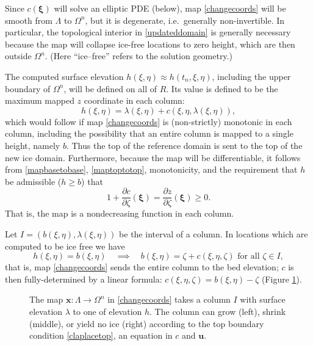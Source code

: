 \documentclass[letterpaper,final,12pt,reqno]{amsart}
\newcommand{\bu}{\mathbf{u}}
\newcommand{\bx}{\mathbf{x}}
\newcommand{\bxi}{\bm{\xi}}
\begin{document}
Since $c(\bxi)$ will solve an elliptic PDE (below), map \eqref{changecoords} will be smooth from $\Lambda$ to $\Omega^n$, but it is degenerate, i.e.~generally non-invertible.  In particular, the topological interior in \eqref{updateddomain} is generally necessary because the map will collapse ice-free locations to zero height, which are then outside $\Omega^n$.  (Here ``ice--free'' refers to the solution geometry.)

The computed surface elevation $h(\xi,\eta)\approx h(t_n,\xi,\eta)$, including the upper boundary of $\Omega^n$, will be defined on all of $R$.  Its value is defined to be the maximum mapped $z$ coordinate in each column:
\begin{equation}
h(\xi,\eta) = \lambda(\xi,\eta) + c(\xi,\eta,\lambda(\xi,\eta)), \label{maptoptotop}
\end{equation}
which would follow if map \eqref{changecoords} is (non-strictly) monotonic in each column, including the possibility that an entire column is mapped to a single height, namely $b$.  Thus the top of the reference domain is sent to the top of the new ice domain.  Furthermore, because the map will be differentiable, it follows from \eqref{mapbasetobase}, \eqref{maptoptotop}, monotonicity, and the requirement that $h$ be admissible ($h\ge b$) that
\begin{equation}
1 + \frac{\partial c}{\partial \zeta}(\bxi) = \frac{\partial z}{\partial \zeta}(\bxi) \ge 0. \label{mapmonotonic}
\end{equation}
That is, the map is a nondecreasing function in each column.

Let $I=(b(\xi,\eta),\lambda(\xi,\eta))$ be the interval of a column.  In locations which are computed to be ice free we have
\begin{equation}
h(\xi,\eta)=b(\xi,\eta) \quad \implies \quad b(\xi,\eta) = \zeta + c(\xi,\eta,\zeta) \text{ for all } \zeta \in I, \label{mapcrushes}
\end{equation}
that is, map \eqref{changecoords} sends the entire column to the bed elevation; $c$ is then fully-determined by a linear formula: $c(\xi,\eta,\zeta) = b(\xi,\eta) - \zeta$ (Figure \ref{fig:mapI}).

\begin{figure}[ht]

\caption{The map $\bx:\Lambda \to \Omega^n$ in \eqref{changecoords} takes a column $I$ with surface elevation $\lambda$ to one of elevation $h$.  The column can grow (left), shrink (middle), or yield no ice (right) according to the top boundary condition \eqref{claplacetop}, an equation in $c$ and $\bu$.}
\label{fig:mapI}
\end{figure}
\end{document}
